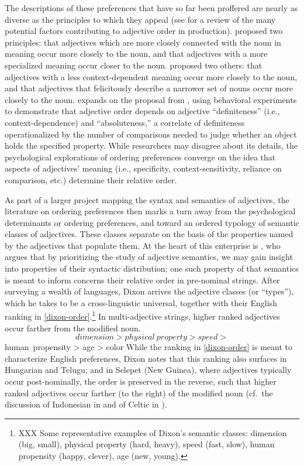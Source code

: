 \documentclass{pnastwo}
\begin{document}
\begin{article}
The descriptions of these preferences that have so far been proffered are nearly as diverse as the principles to which they appeal (see \cite{wulff2003} for a review of the many potential factors contributing to adjective order in production). \cite{sweet1898} proposed two principles: that adjectives which are more closely connected with the noun in meaning occur more closely to the noun, and that adjectives with a more specialized meaning occur closer to the noun. \cite{ziff1960} proposed two others: that adjectives with a less context-dependent meaning occur more closely to the noun, and that adjectives that felicitously describe a narrower set of nouns occur more closely to the noun. \cite{martin1969determinants} expands on the proposal from \cite{ziff1960}, using behavioral experiments to demonstrate that adjective order depends on adjective ``definiteness'' (i.e., context-dependence) and ``absoluteness,'' a correlate of definiteness operationalized by the number of comparisons needed to judge whether an object holds the specified property.
While researchers may disagree about its details, the psychological explorations of ordering preferences converge on the idea that aspects of  adjectives' meaning (i.e., specificity, context-sensitivity, reliance on comparison, etc.) determine their relative order.

As part of a larger project mapping the syntax and semantics of adjectives, the literature on ordering preferences then marks a turn away from the psychological determinants or ordering preferences, and toward an ordered typology of semantic classes of adjectives. These classes separate on the basis of the properties named by the adjectives that populate them. At the heart of this enterprise is \cite{dixon1982}, who argues that by prioritizing the study of adjective semantics, we may gain insight into properties of their syntactic distribution; one such property of that semantics is meant to inform concerns their relative order in pre-nominal strings. After surveying a wealth of languages, Dixon arrives the adjective classes (or ``types''), which he takes to be a cross-linguistic universal, together with their English ranking in \ref{dixon-order}.\footnote{XXX Some representative examples of Dixon's semantic classes: dimension (big, small), physical property (hard, heavy), speed (fast, slow), human propensity (happy, clever), age (new, young).} In multi-adjective strings, higher ranked adjectives occur farther from the modified noun.
\[
dimension > physical\ property > speed > 
\]
\be human\ propensity > age > color\label{dixon-order}\ee
While the ranking in \ref{dixon-order} is meant to characterize English preferences, Dixon notes that this ranking also surfaces in Hungarian and Telugu; and in Selepet (New Guinea), where adjectives typically occur post-nominally, the order is preserved in the reverse, such that higher ranked adjectives occur farther (to the right) of the modified noun (cf.~the discussion of Indonesian in \cite{martin1969competence} and of Celtic in \cite{sproatshih1991}).



\end{article}
\end{document}

